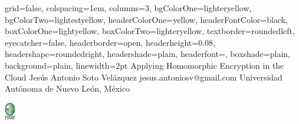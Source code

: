 \documentclass[landscape, a0paper, debug]{baposter}
\begin{document}



\begin{poster}{
    grid=false,
    colspacing=1em,
    columns=3,
    bgColorOne=lighteryellow,
    bgColorTwo=lightestyellow,
    headerColorOne=yellow,
    headerFontColor=black,
    boxColorOne=lightyellow,
    boxColorTwo=lighteryellow,
    textborder=roundedleft,
    eyecatcher=false,
    headerborder=open,
    headerheight=0.08\textheight,
    headershape=roundedright,
    headershade=plain,
    headerfont=\Large\textsf,
    boxshade=plain,
    background=plain,
    linewidth=2pt
  }
  {} 
  {
    \sf Applying Homomorphic Encryption in the Cloud
  }
  {
    \sf Jes\'{u}s Antonio Soto Vel\'{a}zquez\hspace{3em}
    jesus.antoniosv@gmail.com\hspace{3em}
    Universidad Aut\'{o}noma de Nuevo Le\'{o}n, M\'{e}xico
  }
  {{
      \begin{minipage}{16em}
        \hfill
        \includegraphics[height=2em]{fime}
    \end{minipage}}
  }




\end{poster}
\end{document}
